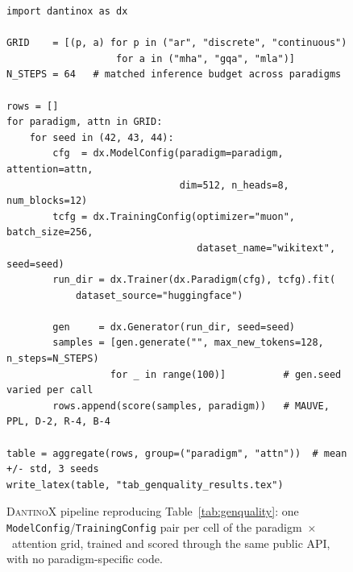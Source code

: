 \begin{figure}[t]
\begin{lstlisting}[style=dxpy]
import dantinox as dx

GRID    = [(p, a) for p in ("ar", "discrete", "continuous")
                   for a in ("mha", "gqa", "mla")]
N_STEPS = 64   # matched inference budget across paradigms

rows = []
for paradigm, attn in GRID:
    for seed in (42, 43, 44):
        cfg  = dx.ModelConfig(paradigm=paradigm, attention=attn,
                              dim=512, n_heads=8, num_blocks=12)
        tcfg = dx.TrainingConfig(optimizer="muon", batch_size=256,
                                 dataset_name="wikitext", seed=seed)
        run_dir = dx.Trainer(dx.Paradigm(cfg), tcfg).fit(
            dataset_source="huggingface")

        gen     = dx.Generator(run_dir, seed=seed)
        samples = [gen.generate("", max_new_tokens=128, n_steps=N_STEPS)
                  for _ in range(100)]          # gen.seed varied per call
        rows.append(score(samples, paradigm))   # MAUVE, PPL, D-2, R-4, B-4

table = aggregate(rows, group=("paradigm", "attn"))  # mean +/- std, 3 seeds
write_latex(table, "tab_genquality_results.tex")
\end{lstlisting}
\vspace{-2mm}
\caption{\textsc{DantinoX} pipeline reproducing
  Table~\ref{tab:genquality}: one \texttt{ModelConfig}/\texttt{TrainingConfig}
  pair per cell of the paradigm~$\times$~attention grid, trained and scored
  through the same public API, with no paradigm-specific code.}
\label{lst:table2}
\end{figure}
